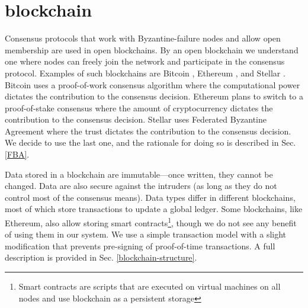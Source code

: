 
\chapter{blockchain}
\label{blockchain}
Consensus protocols that work with Byzantine-failure nodes and allow open membership are used in open blockchains. By an open blockchain we understand one where nodes can freely join the network and participate in the consensus protocol. Examples of such blockchains are Bitcoin \cite{nakamoto2008peer}, Ethereum \cite{wood2014ethereum}, and Stellar \cite{mazieres2015stellar}. Bitcoin uses a proof-of-work consensus algorithm where the computational power dictates the contribution to the consensus decision. Ethereum plans to switch to a proof-of-stake consensus where the amount of cryptocurrency dictates the contribution to the consensus decision. Stellar uses Federated Byzantine Agreement where the trust dictates the contribution to the consensus decision. We decide to use the last one, and the rationale for doing so is described in Sec. \ref{FBA}.

Data stored in a blockchain are immutable––once written, they cannot be changed. Data are also secure against the intruders (as long as they do not control most of the consensus means). Data types differ in different blockchains, most of which store transactions to update a global ledger. Some blockchains, like Ethereum, also allow storing smart contracts\footnote{Smart contracts are scripts that are executed on virtual machines on all nodes and use blockchain as a persistent storage}, though we do not see any benefit of using them in our system. We use a simple transaction model with a slight modification that prevents pre-signing of proof-of-time transactions. A full description is provided in Sec. \ref{blockchain-structure}.


